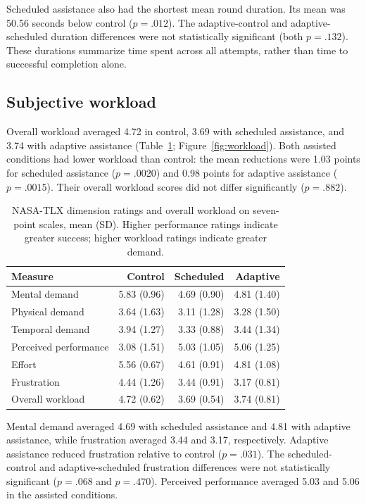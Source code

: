\documentclass[sigconf,anonymous]{aamas}
\begin{document}
Scheduled assistance also had the shortest mean round duration. Its mean was 50.56 seconds below control ($p=.012$). The adaptive-control and adaptive-scheduled duration differences were not statistically significant (both $p=.132$). These durations summarize time spent across all attempts, rather than time to successful completion alone.


\subsection{Subjective workload}

Overall workload averaged 4.72 in control, 3.69 with scheduled assistance, and 3.74 with adaptive assistance (Table~\ref{tab:workload}; Figure~\ref{fig:workload}). Both assisted conditions had lower workload than control: the mean reductions were 1.03 points for scheduled assistance ($p=.0020$) and 0.98 points for adaptive assistance ($p=.0015$). Their overall workload scores did not differ significantly ($p=.882$).

\begin{table}[t]
\centering
\caption{NASA-TLX dimension ratings and overall workload on seven-point scales, mean (SD). Higher performance ratings indicate greater success; higher workload ratings indicate greater demand.}
\label{tab:workload}
\begingroup\small\setlength{\tabcolsep}{4pt}
\begin{tabular}{lrrr}
\toprule
Measure & Control & Scheduled & Adaptive \\
\midrule
Mental demand & 5.83 (0.96) & 4.69 (0.90) & 4.81 (1.40) \\
Physical demand & 3.64 (1.63) & 3.11 (1.28) & 3.28 (1.50) \\
Temporal demand & 3.94 (1.27) & 3.33 (0.88) & 3.44 (1.34) \\
Perceived performance & 3.08 (1.51) & 5.03 (1.05) & 5.06 (1.25) \\
Effort & 5.56 (0.67) & 4.61 (0.91) & 4.81 (1.08) \\
Frustration & 4.44 (1.26) & 3.44 (0.91) & 3.17 (0.81) \\
Overall workload & 4.72 (0.62) & 3.69 (0.54) & 3.74 (0.81) \\
\bottomrule
\end{tabular}
\endgroup
\end{table}

Mental demand averaged 4.69 with scheduled assistance and 4.81 with adaptive assistance, while frustration averaged 3.44 and 3.17, respectively. Adaptive assistance reduced frustration relative to control ($p=.031$). The scheduled-control and adaptive-scheduled frustration differences were not statistically significant ($p=.068$ and $p=.470$). Perceived performance averaged 5.03 and 5.06 in the assisted conditions.
\end{document}
